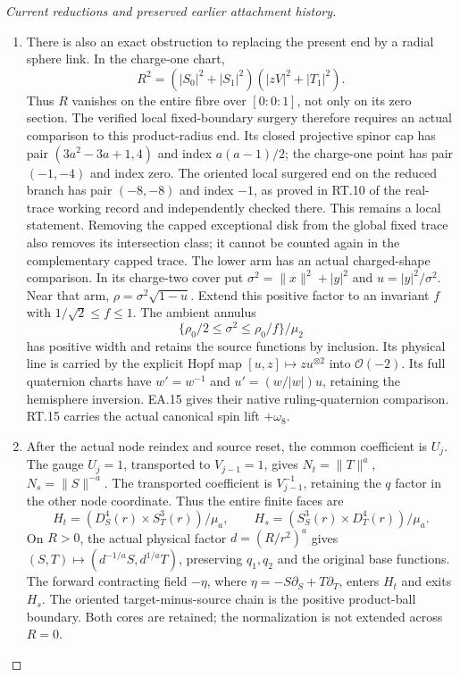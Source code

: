 \begin{proof}[Current reductions and preserved earlier attachment history]
\begin{enumerate}[label=\arabic*.]
\item There is also an exact obstruction to replacing the present
end by a radial sphere link. In the charge-one chart,
\[
 R^2=(|S_0|^2+|S_1|^2)(|zV|^2+|T_1|^2).
\]
Thus \(R\) vanishes on the entire fibre over
\([0:0:1]\), not only on its zero section. The verified
local fixed-boundary surgery therefore requires an actual
comparison to this product-radius end. Its closed
projective spinor cap has pair
\((3a^2-3a+1,4)\) and index \(a(a-1)/2\);
the charge-one point has pair \((-1,-4)\) and index zero.
The oriented local surgered end on the reduced branch
has pair \((-8,-8)\) and index \(-1\), as proved in
RT.10 of the real-trace working record and independently
checked there. This remains a local statement. Removing
the capped exceptional disk from the global fixed trace
also removes its intersection class; it cannot be counted
again in the complementary capped trace. The lower arm has an actual charged-shape comparison. In its
charge-two cover put \(\sigma^2=\|x\|^2+|y|^2\) and
\(u=|y|^2/\sigma^2\). Near that arm,
\(\rho=\sigma^2\sqrt{1-u}\). Extend this positive factor
to an invariant \(f\) with \(1/\sqrt2\le f\le1\).
The ambient annulus
\[
 \{\rho_0/2\le\sigma^2\le\rho_0/f\}/\mu_2
\]
has positive width and retains the source functions by inclusion.
Its physical line is carried by the explicit Hopf map
\([u,z]\mapsto z u^{\otimes2}\) into \(\mathcal O(-2)\).
Its full quaternion charts have \(w'=w^{-1}\) and
\(u'=(w/|w|)u\), retaining the hemisphere inversion.
EA.15 gives their native ruling-quaternion comparison.
RT.15 carries the actual canonical spin lift \(+\omega_8\).

\item After the actual node reindex and source reset, the common
coefficient is \(U_j\). The gauge \(U_j=1\), transported to
\(V_{j-1}=1\), gives \(N_t=\|T\|^a\), \(N_s=\|S\|^{-a}\).
The transported coefficient is \(V_{j-1}^{-1}\), retaining
the \(q\) factor in the other node coordinate. Thus the entire
finite faces are
\[
 H_t=(D^4_S(r)\times S^3_T(r))/\mu_a,\qquad
 H_s=(S^3_S(r)\times D^4_T(r))/\mu_a.
\]
On \(R>0\), the actual physical factor \(d=(R/r^2)^a\)
gives \((S,T)\mapsto(d^{-1/a}S,d^{1/a}T)\), preserving
\(q_1,q_2\) and the original base functions.
The forward contracting field \(-\eta\), where
\(\eta=-S\partial_S+T\partial_T\), enters \(H_t\) and
exits \(H_s\). The oriented target-minus-source chain is
the positive product-ball boundary. Both cores are retained;
the normalization is not extended across \(R=0\).


\end{enumerate}
\end{proof}

